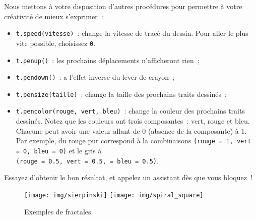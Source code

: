 \documentclass[11pt,a4paper]{article}
\begin{document}
Nous mettons à votre disposition d'autres procédures pour permettre à
votre créativité de mieux s'exprimer~:

\begin{itemize}
    \item \lstinline{t.speed(vitesse)}~: change la vitesse de tracé du dessin. Pour
        aller le plus vite possible, choisissez \lstinline{0}.
    \item \lstinline{t.penup()}~: les prochains déplacements n'afficheront rien~;
    \item \lstinline{t.pendown()}~: a l'effet inverse du lever de crayon~;
    \item \lstinline{t.pensize(taille)}~: change la taille des prochains traits
        dessinés~;
    \item \lstinline{t.pencolor(rouge, vert, bleu)}~: change la couleur des
        prochains traits dessinés. Notez que les couleurs ont trois
        composantes~: vert, rouge et bleu. Chacune peut avoir une valeur allant
        de 0 (absence de la composante) à 1. Par exemple, du rouge pur
        correspond à la combinaisons \lstinline{(rouge = 1, vert = 0, bleu = 0)}
        et le gris à \\ \lstinline{(rouge = 0.5, vert = 0.5, = bleu = 0.5)}.
\end{itemize}

Essayez d'obtenir le bon résultat, et appelez un assistant dès que vous
bloquez~!

\begin{figure}[H]
    \centering
    \texttt{[image: img/sierpinski]}
    \texttt{[image: img/spiral\_square]}
    \caption{Exemples de fractales}
    \label{fig:fractales}
\end{figure}
\end{document}
